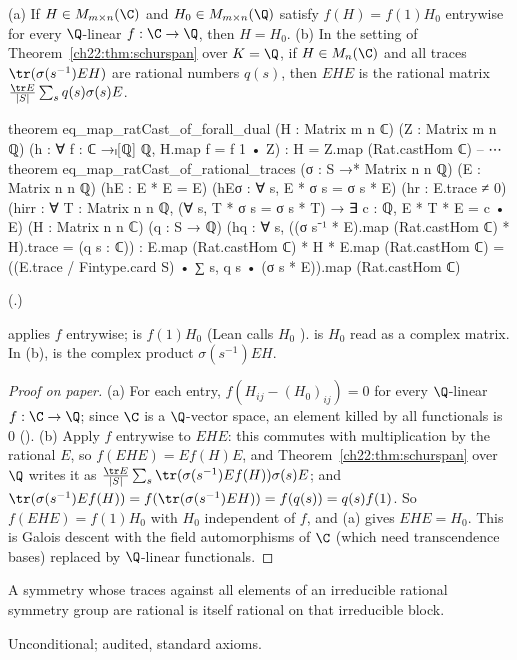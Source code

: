 \begin{theorem}\label{ch22:thm:descent}
(a) If $H\in M_{m\times n}(\C)$ and $H_0\in M_{m\times n}(\Q)$ satisfy $f(H)=f(1)H_0$ entrywise for every $\Q$-linear
$f:\C\to\Q$, then $H=H_0$.
(b) In the setting of Theorem~\ref{ch22:thm:schurspan} over $K=\Q$, if $H\in M_n(\C)$ and all traces
$\tr(\sigma(s^{-1})EH)$ are rational numbers $q(s)$, then $EHE$ is the rational matrix
$\frac{\tr E}{|S|}\sum_sq(s)\sigma(s)E$.
\end{theorem}
\begin{leancode}
theorem eq_map_ratCast_of_forall_dual (H : Matrix m n ℂ) (Z : Matrix m n ℚ)
    (h : ∀ f : ℂ →ₗ[ℚ] ℚ, H.map f = f 1 • Z) : H = Z.map (Rat.castHom ℂ)
-- ⋯
theorem eq_map_ratCast_of_rational_traces (σ : S →* Matrix n n ℚ) (E : Matrix n n ℚ)
    (hE : E * E = E) (hEσ : ∀ s, E * σ s = σ s * E) (hr : E.trace ≠ 0)
    (hirr : ∀ T : Matrix n n ℚ, (∀ s, T * σ s = σ s * T) → ∃ c : ℚ, E * T * E = c • E)
    (H : Matrix n n ℂ) (q : S → ℚ)
    (hq : ∀ s, ((σ s⁻¹ * E).map (Rat.castHom ℂ) * H).trace = (q s : ℂ)) :
    E.map (Rat.castHom ℂ) * H * E.map (Rat.castHom ℂ)
      = ((E.trace / Fintype.card S) • ∑ s, q s • (σ s * E)).map (Rat.castHom ℂ)
\end{leancode}
(.)
\begin{dictionary}
 applies $f$ entrywise;  is $f(1)H_0$ (Lean calls $H_0$ ).   is $H_0$ read as a complex
matrix.  In (b),  is the complex product $\sigma(s^{-1})EH$.
\end{dictionary}
\begin{proof}[Proof on paper]
(a) For each entry, $f(H_{ij}-(H_0)_{ij})=0$ for every $\Q$-linear $f:\C\to\Q$; since $\C$ is a $\Q$-vector space, an element
killed by all functionals is $0$ ().  (b) Apply $f$ entrywise to $EHE$: this
commutes with multiplication by the rational $E$, so $f(EHE)=Ef(H)E$, and Theorem~\ref{ch22:thm:schurspan} over $\Q$
writes it as $\frac{\tr E}{|S|}\sum_s\tr(\sigma(s^{-1})Ef(H))\sigma(s)E$; and $\tr(\sigma(s^{-1})Ef(H))=f(\tr(\sigma(s^{-1})EH))=
f(q(s))=q(s)f(1)$.  So $f(EHE)=f(1)H_0$ with $H_0$ independent of $f$, and (a) gives $EHE=H_0$.  This is Galois descent with the
field automorphisms of $\C$ (which need transcendence bases) replaced by $\Q$-linear functionals.
\end{proof}
\begin{physics}A symmetry whose traces against all elements of an irreducible rational symmetry group are rational is
itself rational on that irreducible block.\end{physics}
\begin{status}Unconditional; audited, standard axioms.\end{status}

